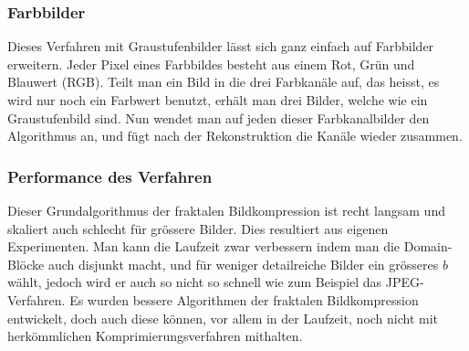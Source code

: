 \subsubsection{Farbbilder}
Dieses Verfahren mit Graustufenbilder lässt sich ganz einfach auf Farbbilder erweitern.
Jeder Pixel eines Farbbildes besteht aus einem Rot, Grün und Blauwert (RGB).
Teilt man ein Bild in die drei Farbkanäle auf, das heisst, es wird nur noch ein Farbwert benutzt, erhält man drei Bilder, welche wie ein Graustufenbild sind.
Nun wendet man auf jeden dieser Farbkanalbilder den Algorithmus an, und fügt nach der Rekonstruktion die Kanäle wieder zusammen. 

\subsubsection{Performance des Verfahren}
Dieser Grundalgorithmus der fraktalen Bildkompression ist recht langsam und skaliert auch schlecht für grössere Bilder.
Dies resultiert aus eigenen Experimenten.
Man kann die Laufzeit zwar verbessern indem man die Domain-Blöcke auch disjunkt macht, und für weniger detailreiche Bilder ein grösseres $b$ wählt, jedoch wird er auch so nicht so schnell wie zum Beispiel das JPEG-Verfahren.
Es wurden bessere Algorithmen der fraktalen Bildkompression entwickelt, doch auch diese können, vor allem in der Laufzeit, noch nicht mit herkömmlichen Komprimierungsverfahren mithalten.

